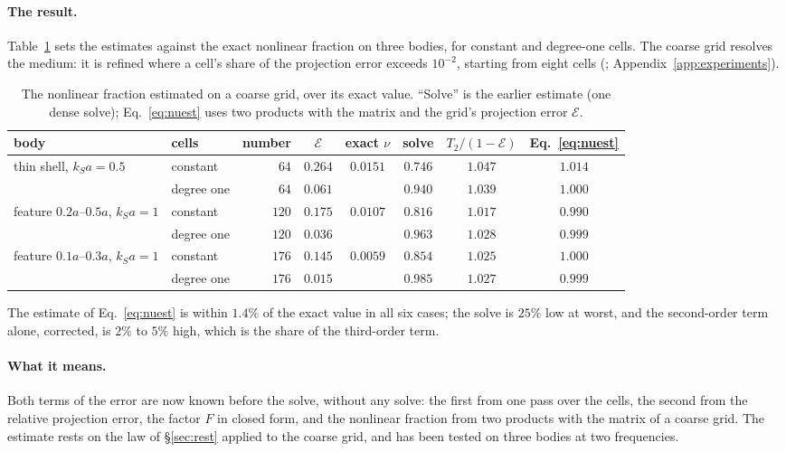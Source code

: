 \documentclass[11pt,a4paper]{article}
\newcommand{\cE}{\mathcal{E}}
\begin{document}
\paragraph{The result.} Table~\ref{tab:nu} sets the estimates against the exact nonlinear fraction on
three bodies, for constant and degree-one cells. The coarse grid resolves the medium: it is refined
where a cell's share of the projection error exceeds $10^{-2}$, starting from eight cells
(; Appendix~\ref{app:experiments}).
\begin{table}[htbp]
\centering
\caption{The nonlinear fraction estimated on a coarse grid, over its exact value. ``Solve'' is the
earlier estimate (one dense solve); Eq.~\eqref{eq:nuest} uses two products with the matrix and the
grid's projection error $\cE$.}\label{tab:nu}
\small
\begin{tabular}{@{}llrccccc@{}}
\toprule
body & cells & number & $\cE$ & exact $\nu$ & solve & $T_2/(1-\cE)$ & Eq.~\eqref{eq:nuest} \\
\midrule
thin shell, $k_Sa=0.5$ & constant & $64$ & $0.264$ & $0.0151$ & $0.746$ & $1.047$ & $1.014$ \\
 & degree one & $64$ & $0.061$ & & $0.940$ & $1.039$ & $1.000$ \\
feature $0.2a$--$0.5a$, $k_Sa=1$ & constant & $120$ & $0.175$ & $0.0107$ & $0.816$ & $1.017$ & $0.990$ \\
 & degree one & $120$ & $0.036$ & & $0.963$ & $1.028$ & $0.999$ \\
feature $0.1a$--$0.3a$, $k_Sa=1$ & constant & $176$ & $0.145$ & $0.0059$ & $0.854$ & $1.025$ & $1.000$ \\
 & degree one & $176$ & $0.015$ & & $0.985$ & $1.027$ & $0.999$ \\
\bottomrule
\end{tabular}
\end{table}
The estimate of Eq.~\eqref{eq:nuest} is within $1.4\%$ of the exact value in all six cases; the solve
is $25\%$ low at worst, and the second-order term alone, corrected, is $2\%$ to $5\%$ high, which is
the share of the third-order term.

\paragraph{What it means.} Both terms of the error are now known before the solve, without any solve:
the first from one pass over the cells, the second from the relative projection error, the factor
$F$ in closed form, and the nonlinear fraction from two products with the matrix of a coarse grid. The
estimate rests on the law of \S\ref{sec:rest} applied to the coarse grid, and has been tested on three
bodies at two frequencies.
\end{document}
